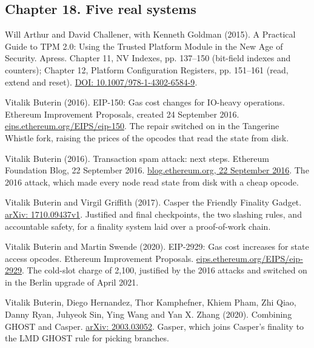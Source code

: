 \documentclass[11pt,twoside]{article}
\theoremstyle{thielethm}
\theoremstyle{thieledef}
\theoremstyle{thieledef}
\theoremstyle{thieledef}
\theoremstyle{thielethm}
\theoremstyle{thieleobs}
\theoremstyle{thielethm}
\begin{document}
\subsection*{Chapter 18. Five real systems}

\noindent Will Arthur and David Challener, with Kenneth Goldman (2015). A Practical Guide to TPM 2.0: Using the Trusted Platform Module in the New Age of Security. Apress. Chapter 11, NV Indexes, pp. 137--150 (bit-field indexes and counters); Chapter 12, Platform Configuration Registers, pp. 151--161 (read, extend and reset). \href{https://doi.org/10.1007/978-1-4302-6584-9}{DOI: 10.1007/978-1-4302-6584-9}.
\par\medskip

\noindent Vitalik Buterin (2016). EIP-150: Gas cost changes for IO-heavy operations. Ethereum Improvement Proposals, created 24 September 2016. \href{https://eips.ethereum.org/EIPS/eip-150}{eips.ethereum.org/EIPS/eip-150}. The repair switched on in the Tangerine Whistle fork, raising the prices of the opcodes that read the state from disk.
\par\medskip

\noindent Vitalik Buterin (2016). Transaction spam attack: next steps. Ethereum Foundation Blog, 22 September 2016. \href{https://blog.ethereum.org/2016/09/22/transaction-spam-attack-next-steps/}{blog.ethereum.org, 22 September 2016}. The 2016 attack, which made every node read state from disk with a cheap opcode.
\par\medskip

\noindent Vitalik Buterin and Virgil Griffith (2017). Casper the Friendly Finality Gadget. \href{https://arxiv.org/abs/1710.09437v1}{arXiv: 1710.09437v1}. Justified and final checkpoints, the two slashing rules, and accountable safety, for a finality system laid over a proof-of-work chain.
\par\medskip

\noindent Vitalik Buterin and Martin Swende (2020). EIP-2929: Gas cost increases for state access opcodes. Ethereum Improvement Proposals. \href{https://eips.ethereum.org/EIPS/eip-2929}{eips.ethereum.org/EIPS/eip-2929}. The cold-slot charge of 2,100, justified by the 2016 attacks and switched on in the Berlin upgrade of April 2021.
\par\medskip

\noindent Vitalik Buterin, Diego Hernandez, Thor Kamphefner, Khiem Pham, Zhi Qiao, Danny Ryan, Juhyeok Sin, Ying Wang and Yan X. Zhang (2020). Combining GHOST and Casper. \href{https://arxiv.org/abs/2003.03052}{arXiv: 2003.03052}. Gasper, which joins Casper's finality to the LMD GHOST rule for picking branches.
\par\medskip
\end{document}
